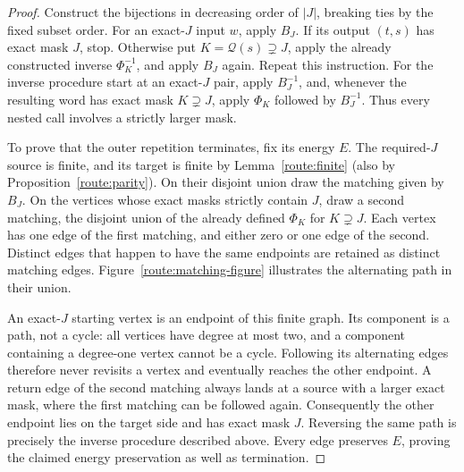 \begin{proof}
Construct the bijections in decreasing order of $|J|$, breaking ties
by the fixed subset order.  For an exact-$J$ input $w$, apply $B_J$.
If its output $(t,s)$ has exact mask $J$, stop.  Otherwise put
$K=\mathcal Q(s)\supsetneq J$, apply the already constructed inverse
$\Phi_K^{-1}$, and apply $B_J$ again.  Repeat this instruction.
For the inverse procedure start at an exact-$J$ pair, apply
$B_J^{-1}$, and, whenever the resulting word has exact mask
$K\supsetneq J$, apply $\Phi_K$ followed by $B_J^{-1}$.
Thus every nested call involves a strictly larger mask.

To prove that the outer repetition terminates, fix its energy $E$.
The required-$J$ source is finite, and its target is finite by
Lemma~\ref{route:finite} (also by
Proposition~\ref{route:parity}).  On their disjoint union draw the
matching given by $B_J$.  On the vertices whose exact masks strictly
contain $J$, draw a second matching, the disjoint union of the
already defined $\Phi_K$ for $K\supsetneq J$.  Each vertex has one
edge of the first matching, and either zero or one edge of the
second.  Distinct edges that happen to have the same endpoints are
retained as distinct matching edges.
Figure~\ref{route:matching-figure} illustrates the alternating path in
their union.

An exact-$J$ starting vertex is an endpoint of this finite graph.
Its component is a path, not a cycle: all vertices have degree at
most two, and a component containing a degree-one vertex cannot be
a cycle.  Following its alternating edges therefore never revisits
a vertex and eventually reaches the other endpoint.  A return edge
of the second matching always lands at a source with a larger
exact mask, where the first matching can be followed again.
Consequently the other endpoint lies on the target side and has
exact mask $J$.  Reversing the same path is precisely the inverse
procedure described above.  Every edge preserves $E$, proving the
claimed energy preservation as well as termination.
\end{proof}

